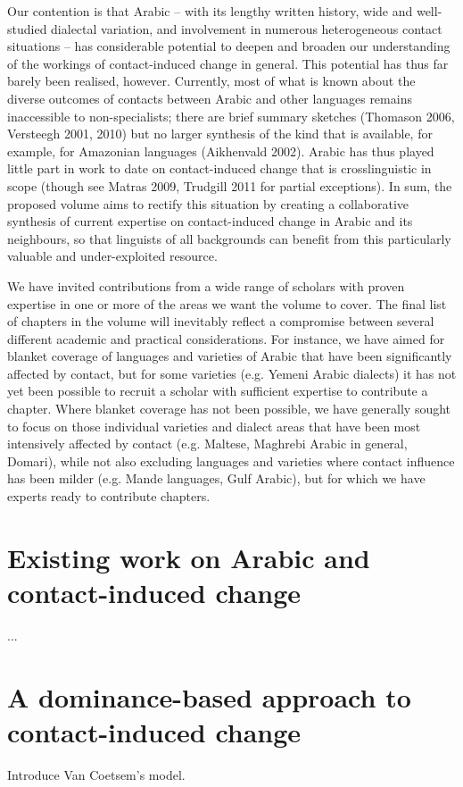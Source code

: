 \documentclass[output=paper]{langsci/langscibook}
\begin{document}
Our contention is that Arabic – with its lengthy written history, wide and well-studied dialectal variation, and involvement in numerous heterogeneous contact situations – has considerable potential to deepen and broaden our understanding of the workings of contact-induced change in general. This potential has thus far barely been realised, however. Currently, most of what is known about the diverse outcomes of contacts between Arabic and other languages remains inaccessible to non-specialists; there are brief summary sketches (Thomason 2006, Versteegh 2001, 2010) but no larger synthesis of the kind that is available, for example, for Amazonian languages (Aikhenvald 2002). Arabic has thus played little part in work to date on contact-induced change that is crosslinguistic in scope (though see Matras 2009, Trudgill 2011 for partial exceptions). 
In sum, the proposed volume aims to rectify this situation by creating a collaborative synthesis of current expertise on contact-induced change in Arabic and its neighbours, so that linguists of all backgrounds can benefit from this particularly valuable and under-exploited resource.

We have invited contributions from a wide range of scholars with proven expertise in one or more of the areas we want the volume to cover. The final list of chapters in the volume will inevitably reflect a compromise between several different academic and practical considerations. For instance, we have aimed for blanket coverage of languages and varieties of Arabic that have been significantly affected by contact, but for some varieties (e.g. Yemeni Arabic dialects) it has not yet been possible to recruit a scholar with sufficient expertise to contribute a chapter. Where blanket coverage has not been possible, we have generally sought to focus on those individual varieties and dialect areas that have been most intensively affected by contact (e.g. Maltese, Maghrebi Arabic in general, Domari), while not also excluding languages and varieties where contact influence has been milder (e.g. Mande languages, Gulf Arabic), but for which we have experts ready to contribute chapters.




\section{Existing work on Arabic and contact-induced change}
...

\section{A dominance-based approach to contact-induced change}
Introduce Van Coetsem's model.
\end{document}
